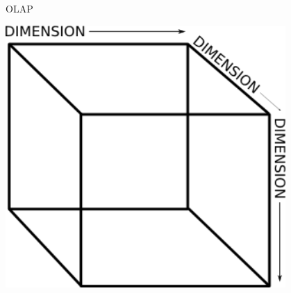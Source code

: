\documentclass{beamer}
\begin{document}

\begin{frame}{OLAP}
    \begin{center}
        \includegraphics[width=0.8\textwidth]{cube.png}
    \end{center}
\end{frame}
\end{document}
